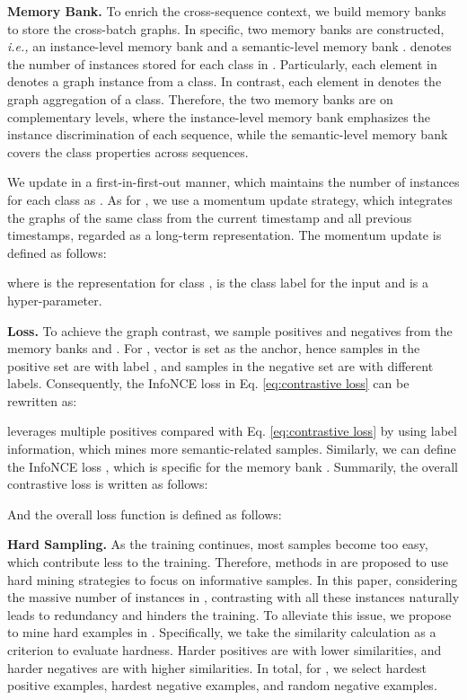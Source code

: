 \documentclass{article} \usepackage{iclr2023_conference,times}
\begin{document}
\noindent \textbf{Memory Bank.} To enrich the cross-sequence context, we build memory banks to store the cross-batch graphs. In specific, two memory banks are constructed, \emph{i.e.,} an instance-level memory bank  and a semantic-level memory bank .  denotes the number of instances stored for each class in . Particularly, each element in  denotes a graph instance from a class. In contrast, each element in  denotes the graph aggregation of a class. Therefore, the two memory banks are on complementary levels, where the instance-level memory bank emphasizes the instance discrimination of each sequence, while the semantic-level memory bank covers the class properties across sequences.

We update  in a first-in-first-out manner, which maintains the number of instances for each class as . As for , we use a momentum update strategy, which integrates the graphs of the same class from the current timestamp and all previous timestamps, regarded as a long-term representation. The momentum update is defined as follows:

where  is the representation for class ,  is the class label for the input  and  is a hyper-parameter. 

\noindent \textbf{Loss.} To achieve the graph contrast, we sample positives and negatives from the memory banks  and . For , vector  is set as the anchor, hence samples in the positive set  are with label , and samples in the negative set  are with different labels. Consequently, the InfoNCE loss in Eq. \ref{eq:contrastive loss} can be rewritten as:



 leverages multiple positives compared with Eq. \ref{eq:contrastive loss} by using label information, which mines more semantic-related samples. Similarly, we can define the InfoNCE loss , which is specific for the memory bank . Summarily, the overall contrastive loss is written as follows:

And the overall loss function is defined as follows:

\noindent \textbf{Hard Sampling.} As the training continues, most samples become too easy, which contribute less to the training. Therefore, methods in \citep{tabassum2022hard, hard1, hard2, cross-sequence-semantic} are proposed to use hard mining strategies to focus on informative samples. In this paper, considering the massive number of instances in , contrasting with all these instances naturally leads to redundancy and hinders the training. To alleviate this issue, we propose to mine hard examples in . Specifically, we take the similarity calculation  as a criterion to evaluate hardness. Harder positives are with lower similarities, and harder negatives are with higher similarities. In total, for , we select  hardest positive examples,  hardest negative examples, and  random negative examples.
\end{document}
